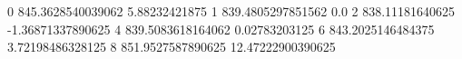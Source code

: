 0 845.3628540039062 5.88232421875
1 839.4805297851562 0.0
2 838.11181640625 -1.36871337890625
4 839.5083618164062 0.02783203125
6 843.2025146484375 3.72198486328125
8 851.9527587890625 12.47222900390625
